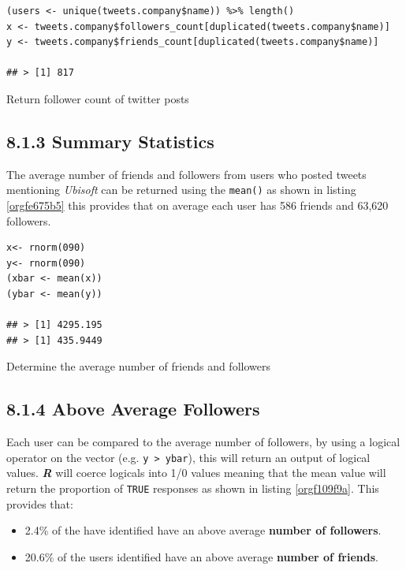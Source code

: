 \documentclass[11pt]{article}
\begin{document}
\begin{listing}[htbp]
\begin{verbatim}
(users <- unique(tweets.company$name)) %>% length()
x <- tweets.company$followers_count[duplicated(tweets.company$name)]
y <- tweets.company$friends_count[duplicated(tweets.company$name)]

## > [1] 817
\end{verbatim}
\caption{\label{org02e2008}Return follower count of twitter posts}
\end{listing}


\subsection{8.1.3 Summary Statistics}
\label{sec:org63a973f}
The average number of friends and followers from users who posted tweets mentioning \emph{Ubisoft} can be returned using the \texttt{mean()} as shown in listing \ref{orgfe675b5}
this provides that on average each user has 586 friends and 63,620 followers.

\begin{listing}[htbp]
\begin{verbatim}
x<- rnorm(090)
y<- rnorm(090)
(xbar <- mean(x))
(ybar <- mean(y))

## > [1] 4295.195
## > [1] 435.9449
\end{verbatim}
\caption{\label{orgfe675b5}Determine the average number of friends and followers}
\end{listing}

\subsection{8.1.4 Above Average Followers}
\label{sec:org9fe7812}
Each user can be compared to the average number of followers, by using a logical
operator on the vector (e.g. \texttt{y > ybar}), this will return an output of logical
values. \textbf{\emph{R}} will coerce logicals into 1/0 values meaning that the mean value
will return the proportion of \texttt{TRUE} responses as shown in listing \ref{orgf109f9a}. This
provides that:

\begin{itemize}
\item 2.4\%  of the have identified have an above average \textbf{number of followers}.
\item 20.6\% of the users identified have an above average \textbf{number of friends}.
\end{itemize}
\end{document}
